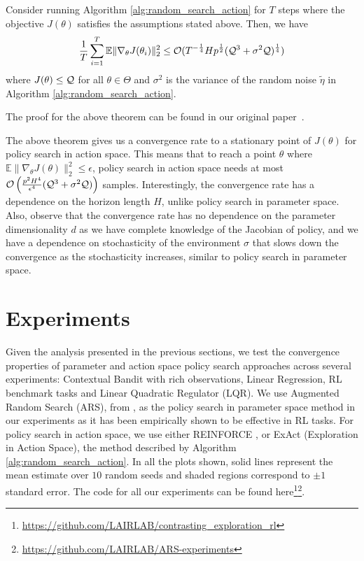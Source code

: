 \begin{theorem}
\label{theorem:action-convergence}
  Consider running Algorithm \ref{alg:random_search_action} for $T$
  steps where the objective $J(\theta)$ satisfies the assumptions stated above. Then, we have %
  \begin{equation}
    \label{eq:action-convergence}
    \frac{1}{T}\sum_{i=1}^T \mathbb{E}\|\nabla_\theta
    J(\theta_i)\|_2^2 \leq \mathcal{O}(T^{-\frac{1}{4}}Hp^{\frac{1}{2}}(\mathcal{Q}^3 + \sigma^2\mathcal{Q})^{\frac{1}{4}})
  \end{equation}
  where $J(\theta)\leq \mathcal{Q}$ for all $\theta \in \Theta$ and $\sigma^2$ is the variance of the random noise $\tilde{\eta}$ in Algorithm \ref{alg:random_search_action}.
\end{theorem}
The proof for the above theorem can be found in our original paper~\cite{aistats19}.

The above theorem gives us a convergence rate to a stationary point of
$J(\theta)$ for policy search in action space. This means that to
reach a point $\theta$ where $\mathbb{E}\|\nabla_\theta
J(\theta)\|_2^2 \leq \epsilon$, policy search in action space needs at
most $\mathcal{O}\left( \frac{p^2H^4}{\epsilon^4} (\mathcal{Q}^3 + \sigma^2\mathcal{Q}) \right)$
samples. Interestingly, the convergence rate has a
dependence on the horizon length $H$, unlike policy search in
parameter space.
%
%
%
%
Also, observe that the 
convergence rate has no dependence on the parameter dimensionality $d$ as we have complete
knowledge of the Jacobian of policy, and  we have a dependence
on stochasticity of the environment $\sigma$ that slows down the convergence as the stochasticity 
increases, similar to policy search in parameter space.

\section{Experiments}
\label{sec:experiments}
Given the analysis presented in the previous sections, we test the
convergence properties of parameter and action space policy search
approaches across several experiments: Contextual Bandit with rich observations, Linear Regression, RL
benchmark tasks and Linear Quadratic Regulator (LQR). We use Augmented Random Search (ARS), from 
\citep{mania2018simple}, as the policy search in parameter space
method in our experiments as it has been empirically shown to be
effective in RL tasks. For policy search in action space, we use
either REINFORCE 
\citep{williams1992simple}, or ExAct (Exploration in Action Space), the method described by
Algorithm \ref{alg:random_search_action}.
In all the plots shown, solid lines
represent the mean estimate over $10$ random seeds and shaded regions
correspond to $\pm 1$ standard error.
The code for all our experiments can be found here\footnote{\url{https://github.com/LAIRLAB/contrasting_exploration_rl}}\footnote{\url{https://github.com/LAIRLAB/ARS-experiments}}.

